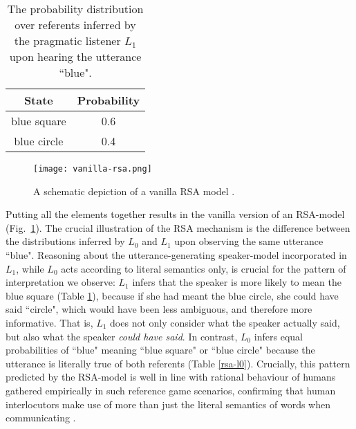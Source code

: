 \begin{table}[h]
	\begin{center}
		\caption{The probability distribution over referents inferred by the pragmatic listener $L_1$ upon hearing the utterance ``blue".}
		\label{rsa-l1}
		\vskip 0.12in
		\begin{tabular}{cc}
			State & Probability \\
			\hline
			blue square & 0.6 \\
			blue circle & 0.4
		\end{tabular}
	\end{center}
\end{table}
\begin{figure*}[t]
	\begin{center}
		\texttt{[image: vanilla-rsa.png]}
	\end{center}
	\vspace{-0.3cm}
	\caption{A schematic depiction of a vanilla RSA model \parencite{problang}.}
	\label{vanilla-rsa}
\end{figure*}
Putting all the elements together results in the vanilla version of an RSA-model (Fig.~\ref{vanilla-rsa}).
The crucial illustration of the RSA mechanism is the difference between the distributions inferred by $L_0$ and $L_1$ upon observing the same utterance ``blue". Reasoning about the utterance-generating speaker-model incorporated in $L_1$, while $L_0$ acts according to literal semantics only, is crucial for the pattern of interpretation we observe: $L_1$ infers that the speaker is more likely to mean the blue square  (Table \ref{rsa-l1}), because if she had meant the blue circle, she could have said ``circle", which would have been less ambiguous, and therefore more informative. That is, $L_1$ does not only consider what the speaker actually said, but also what the speaker \emph{could have said}. In contrast, $L_0$ infers equal probabilities of ``blue" meaning ``blue square" or ``blue circle" because the utterance is literally true of both referents (Table \ref{rsa-l0}). Crucially, this pattern predicted by the RSA-model is well in line with rational behaviour of humans gathered empirically in such reference game scenarios, confirming that human interlocutors make use of more than just the literal semantics of words when communicating \parencite{frank2012predicting, problang}.


